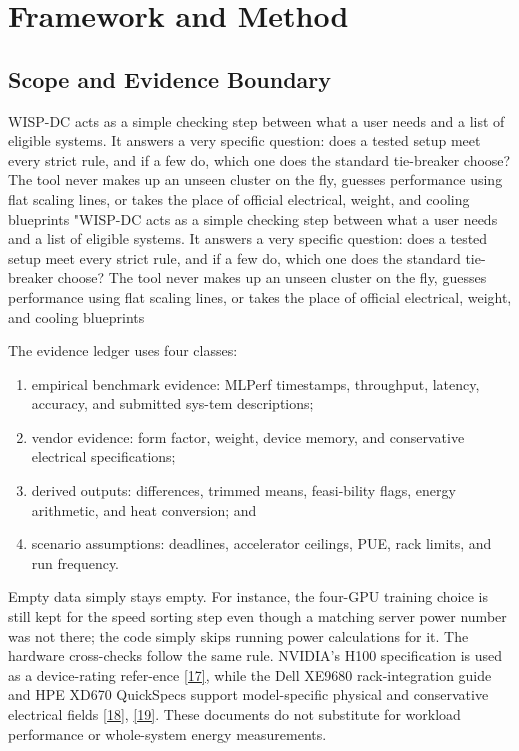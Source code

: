 \documentclass[final,3p,12pt,nopreprintline]{elsarticle}
\begin{document}
\section{Framework and Method}


\subsection{Scope and Evidence Boundary}


WISP-DC acts as a simple checking step between what a user needs and a list of eligible systems. It answers a very specific question: does a tested setup meet every strict rule, and if a few do, which one does the standard tie-breaker choose? The tool never makes up an unseen cluster on the fly, guesses performance using flat scaling lines, or takes the place of official electrical, weight, and cooling blueprints "WISP-DC acts as a simple checking step between what a user needs and a list of eligible systems. It answers a very specific question: does a tested setup meet every strict rule, and if a few do, which one does the standard tie-breaker choose? The tool never makes up an unseen cluster on the fly, guesses performance using flat scaling lines, or takes the place of official electrical, weight, and cooling blueprints


The evidence ledger uses four classes:


\begin{enumerate}

\item empirical benchmark evidence: MLPerf timestamps, throughput, latency, accuracy, and submitted sys-tem descriptions;

\item vendor evidence: form factor, weight, device memory, and conservative electrical specifications;

\item derived outputs: differences, trimmed means, feasi-bility flags, energy arithmetic, and heat conversion; and

\item scenario assumptions: deadlines, accelerator ceilings, PUE, rack limits, and run frequency.

\end{enumerate}

Empty data simply stays empty. For instance, the four-GPU training choice is still kept for the speed sorting step even though a matching server power number was not there; the code simply skips running power calculations for it. The hardware cross-checks follow the same rule. NVIDIA’s H100 specification is used as a device-rating refer-ence \hyperref[ref:17]{[17]}, while the Dell XE9680 rack-integration guide and HPE XD670 QuickSpecs support model-specific physical and conservative electrical fields \hyperref[ref:18]{[18]}, \hyperref[ref:19]{[19]}. These documents do not substitute for workload performance or whole-system energy measurements.
\end{document}
